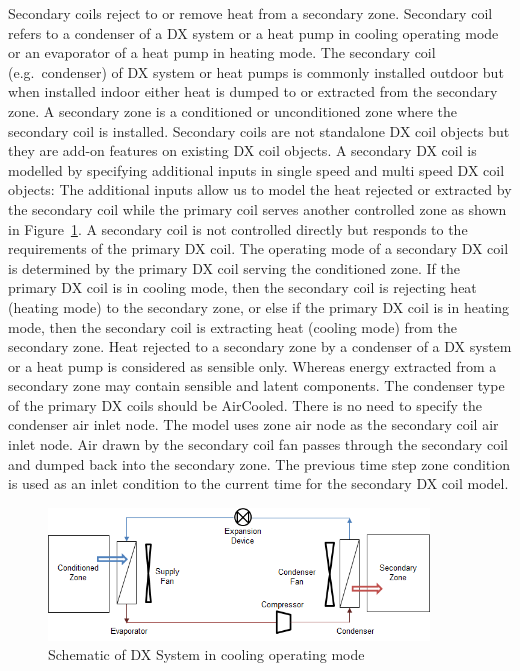 Secondary coils reject to or remove heat from a secondary zone. Secondary coil refers to a condenser of a DX system or a heat pump in cooling operating mode or an evaporator of a heat pump in heating mode. The secondary coil (e.g.~condenser) of DX system or heat pumps is commonly installed outdoor but when installed indoor either heat is dumped to or extracted from the secondary zone. A secondary zone is a conditioned or unconditioned zone where the secondary coil is installed. Secondary coils are not standalone DX coil objects but they are add-on features on existing DX coil objects. A secondary DX coil is modelled by specifying additional inputs in single speed and multi speed DX coil objects: The additional inputs allow us to model the heat rejected or extracted by the secondary coil while the primary coil serves another controlled zone as shown in Figure~\ref{fig:schematic-of-dx-system-in-cooling-operating-mode}. A secondary coil is not controlled directly but responds to the requirements of the primary DX coil. The operating mode of a secondary DX coil is determined by the primary DX coil serving the conditioned zone. If the primary DX coil is in cooling mode, then the secondary coil is rejecting heat (heating mode) to the secondary zone, or else if the primary DX coil is in heating mode, then the secondary coil is extracting heat (cooling mode) from the secondary zone. Heat rejected to a secondary zone by a condenser of a DX system or a heat pump is considered as sensible only. Whereas energy extracted from a secondary zone may contain sensible and latent components. The condenser type of the primary DX coils should be AirCooled. There is no need to specify the condenser air inlet node. The model uses zone air node as the secondary coil air inlet node. Air drawn by the secondary coil fan passes through the secondary coil and dumped back into the secondary zone. The previous time step zone condition is used as an inlet condition to the current time for the secondary DX coil model.

\begin{figure}[hbtp]
\centering
\includegraphics[width=0.9\textwidth, height=0.9\textheight, keepaspectratio=true]{media/image8002.png}
\caption{Schematic of DX System in cooling operating mode \protect \label{fig:schematic-of-dx-system-in-cooling-operating-mode}}
\end{figure}

